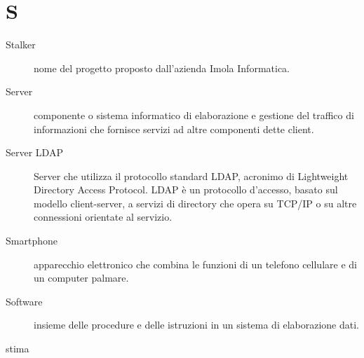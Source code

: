 \documentclass{article}
\begin{document}
	\section{S}
	\begin{description}
		\item[Stalker] nome del progetto proposto dall'azienda Imola Informatica.
		\item[Server] componente o sistema informatico di elaborazione e gestione del traffico di informazioni che fornisce servizi ad altre componenti dette client.
		\item[Server LDAP] Server che utilizza il protocollo standard LDAP, acronimo di Lightweight Directory Access Protocol. LDAP è un protocollo d'accesso, basato sul modello client-server, a servizi di directory che opera su TCP/IP o su altre connessioni orientate al servizio.
		\item[Smartphone] apparecchio elettronico che combina le funzioni di un telefono cellulare e di un computer palmare.
		\item[Software] insieme delle procedure e delle istruzioni in un sistema di elaborazione dati.
		\item[stima] 
	\end{description}
\end{document}
